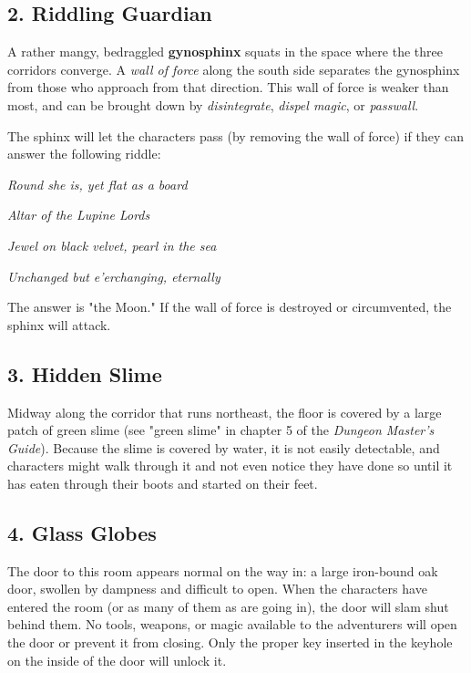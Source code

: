 \documentclass[10pt,a4paper,twoside,bg=print,twocolumn,openany,nodeprecatedcode]{dndbook}
\begin{document}
\subsection{2. Riddling Guardian}
A rather mangy, bedraggled \textbf{gynosphinx} squats in the space where the three corridors converge. A \textit{wall of force} along the south side separates the gynosphinx from those who approach from that direction. This wall of force is weaker than most, and can be brought down by \textit{disintegrate}, \textit{dispel magic}, or \textit{passwall}.

The sphinx will let the characters pass (by removing the wall of force) if they can answer the following riddle:

\begin{DndSidebar}[float=!b]{}
\textit{Round she is, yet flat as a board}



\textit{Altar of the Lupine Lords}



\textit{Jewel on black velvet, pearl in the sea}



\textit{Unchanged but e'erchanging, eternally}



\end{DndSidebar}

The answer is "the Moon." If the wall of force is destroyed or circumvented, the sphinx will attack.

\subsection{3. Hidden Slime}
Midway along the corridor that runs northeast, the floor is covered by a large patch of green slime (see "green slime" in chapter 5 of the \textit{Dungeon Master's Guide}). Because the slime is covered by water, it is not easily detectable, and characters might walk through it and not even notice they have done so until it has eaten through their boots and started on their feet.

\subsection{4. Glass Globes}
The door to this room appears normal on the way in: a large iron-bound oak door, swollen by dampness and difficult to open. When the characters have entered the room (or as many of them as are going in), the door will slam shut behind them. No tools, weapons, or magic available to the adventurers will open the door or prevent it from closing. Only the proper key inserted in the keyhole on the inside of the door will unlock it.
\end{document}
